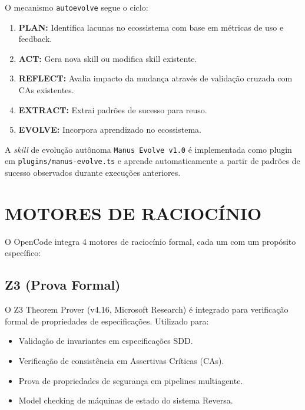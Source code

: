 \documentclass[
  brazil,
  sumario=tradicional,
  10pt
]{abntex2}
\begin{document}
O mecanismo \texttt{autoevolve} \cite{OpenCode2025} segue o ciclo:

\begin{enumerate}
  \item \textbf{PLAN:} Identifica lacunas no ecossistema com base em
    métricas de uso e feedback.
  \item \textbf{ACT:} Gera nova skill ou modifica skill existente.
  \item \textbf{REFLECT:} Avalia impacto da mudança através de
    validação cruzada com CAs existentes.
  \item \textbf{EXTRACT:} Extrai padrões de sucesso para reuso.
  \item \textbf{EVOLVE:} Incorpora aprendizado no ecossistema.
\end{enumerate}

A \textit{skill} de evolução autônoma \texttt{Manus Evolve v1.0} é
implementada como plugin em \texttt{plugins/manus-evolve.ts} e
aprende automaticamente a partir de padrões de sucesso observados
durante execuções anteriores.

\section{MOTORES DE RACIOCÍNIO}
\label{sec:raciocinio}

O OpenCode integra 4 motores de raciocínio formal, cada um com um
propósito específico:

\subsection{Z3 (Prova Formal)}

O Z3 Theorem Prover (v4.16, Microsoft Research) é integrado para
verificação formal de propriedades de especificações. Utilizado para:

\begin{itemize}
  \item Validação de invariantes em especificações SDD.
  \item Verificação de consistência em Assertivas Críticas (CAs).
  \item Prova de propriedades de segurança em pipelines multiagente.
  \item Model checking de máquinas de estado do sistema Reversa.
\end{itemize}
\end{document}
